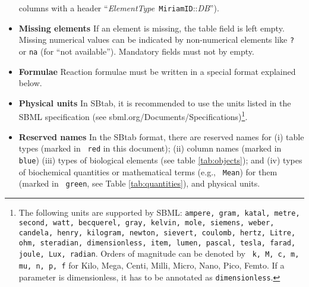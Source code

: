 \documentclass[a4paper]{article}
\newcommand{\la}[1]{}
\newcommand{\tab}[1]{{\texttt{\color{red} #1}}}
\newcommand{\col}[1]{\texttt{\color{blue} #1}}
\newcommand{\defint}[1] {\texttt{\color{darkgreen} #1}}
\begin{document}
\begin{itemize}
  columns with a header
  ``\emph{ElementType}\col{ MiriamID}::\emph{DB}'').  
\la{\item \textbf{Qualifiers} SBtab supports the qualifiers (like ``Is'',
  ``VersionOf'') defined in the MIRIAM resources \cite{bioqualifiers}.
  They can be used within table cells (in the syntax ``\emph{qualifier} \emph{MiriamID}''.}
\la{\item \textbf{Lists within table fields}  Some table fields may contain several entries of the same type
  (e.g., several alternative names for the same substance) separated by
  the ``$|$'' character.}
\item \textbf{Missing elements} If an element is missing, the table
  field is left empty.  Missing numerical values can be indicated by
  non-numerical elements like \texttt{?} or \texttt{na} (for ``not
  available'').  Mandatory fields must not by empty.
\item \textbf{Formulae} Reaction formulae \la{and formulae describing
 biochemical regulations} must be written in a special format explained
 below.  
\item \textbf{Physical units} In SBtab, it is recommended to use the
  units listed in the SBML specification (see
  {sbml.org/Documents/Specifications})\footnote{The following units
    are supported by SBML: {\tt ampere, gram, katal, metre, second,
      watt, becquerel, gray, kelvin, mole, siemens, weber, candela,
      henry, kilogram, newton, sievert, coulomb, hertz, Litre, ohm,
      steradian, dimensionless, item, lumen, pascal, tesla, farad,
      joule, Lux, radian}. Orders of magnitude can be denoted by {\tt
      k, M, c, m, mu, n, p, f} for Kilo, Mega, Centi, Milli, Micro,
    Nano, Pico, Femto.  If a parameter is dimensionless, it has to be
    annotated as {\tt dimensionless}.}.
\item \textbf{Reserved names} In the SBtab format, there are reserved
names for (i)  table types
(marked in \tab{red} in this document); (ii) column names (marked in
\col{blue})
(iii) types of biological elements (see table \ref{tab:objects}); and
(iv) types of biochemical quantities or mathematical terms (e.g.,
\defint{Mean}) for them (marked in \defint{green}, see Table
\ref{tab:quantities}), and physical units.
\end{itemize}
\end{document}
